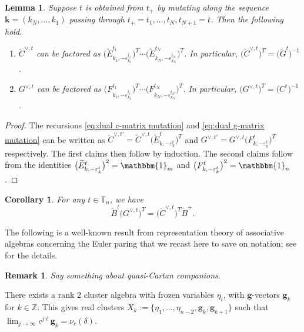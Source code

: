 \documentclass{amsart}
\newtheorem{corollary}[theorem]{Corollary}
\newtheorem{lemma}[theorem]{Lemma}
\newtheorem{remark}[theorem]{Remark}
\numberwithin{theorem}{section}
\newcommand{\bfg}{{\boldsymbol{g}}}
\newcommand{\bfk}{{\boldsymbol{k}}}
\newcommand{\TT}{\mathbb{T}}
\newcommand{\ZZ}{\mathbb{Z}}
\newcommand{\bOne}{\mathbbm{1}}
\begin{document}
  \begin{lemma}
    \label{le:factorize dual matrices}
    Suppose $t$ is obtained from $t_+$ by mutating along the sequence $\bfk=(k_N,\ldots,k_1)$ passing through $t_+=t_1,\ldots,t_N,t_{N+1}=t$.
    Then the following hold.
    \begin{enumerate}
      \item $\widetilde C^{\vee,t}$ can be factored as $\big(\widetilde E^{t_1}_{k_1,-\varepsilon^{t_1}_{k_1}}\big)^T \cdots \big(\widetilde E^{t_N}_{k_N,-\varepsilon^{t_N}_{k_N}}\big)^T$.
        In particular, $\big(\widetilde C^{\vee,t}\big)^T=\big(\widetilde G^t\big)^{-1}$.
      \item $G^{\vee,t}$ can be factored as $\big(F^{t_1}_{k_1,-\varepsilon^{t_1}_{k_1}}\big)^T \cdots \big(F^{t_N}_{k_N,-\varepsilon^{t_N}_{k_N}}\big)^T$.
        In particular, $\big(G^{\vee,t}\big)^T=\big(C^t\big)^{-1}$.
    \end{enumerate}
  \end{lemma}
  \begin{proof}
    The recursions \eqref{eq:dual c-matrix mutation} and \eqref{eq:dual g-matrix mutation} can be written as $\widetilde C^{\vee,t'}=\widetilde C^{\vee,t} \big(\widetilde E^t_{k,-\varepsilon^t_k}\big)^T$ and $G^{\vee,t'}=G^{\vee,t} \big(F^t_{k,-\varepsilon^t_k}\big)^T$ respectively.
    The first claims then follow by induction.
    The second claims follow from the identities $\big(\widetilde E^t_{k,-\varepsilon^t_k}\big)^2=\bOne_m$ and $\big(F^t_{k,-\varepsilon^t_k}\big)^2=\bOne_n$.
  \end{proof}

  \begin{corollary}
    \label{cor:dual BG=CB}
    For any $t\in\TT_n$, we have
    \[\widetilde B^t \big(G^{\vee,t}\big)^T=\big(\widetilde C^{\vee,t}\big)^T \widetilde B^+.\]
  \end{corollary}

  The following is a well-known result from representation theory of associative algebras concerning the Euler paring that we recast here to save on notation; see \cite{dlab_ringel?} for the details.
  \begin{remark}
    Say something about quasi-Cartan companions.
  \end{remark}

  There exists a rank 2 cluster algebra with frozen variables $\eta_i$, with $\bfg$-vectors $\bfg_k$ for $k\in\ZZ$.
  This gives real clusters $X_k:=\{\eta_1,\ldots,\eta_{n-2},\bfg_k,\bfg_{k+1}\}$ such that $\lim_{j\to\infty} c^{j\ell}\bfg_k=\nu_c(\delta)$.
\end{document}
